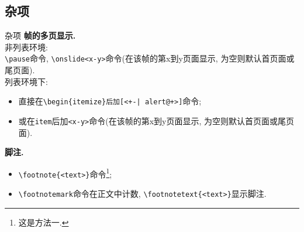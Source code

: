 \subsection{杂项}
\begin{frame}[fragile]{杂项}
	\textbf{帧的多页显示.}\\
	非列表环境: \\
	\verb|\pause|命令, \verb|\onslide<x-y>|命令(在该帧的第x到y页面显示, 为空则默认首页面或尾页面). \\
	列表环境下:
	\begin{itemize}[<+-| alert@+>]
		\item 直接在\verb|\begin|\verb!{itemize}后加!\verb![<+-| alert@+>]!命令;
		\item 或在\verb|item|后加\verb|<x-y>|命令(在该帧的第x到y页面显示, 为空则默认首页面或尾页面).
	\end{itemize}
	\textbf{脚注.}
	\begin{itemize}[<+-| alert@+>]
		\item \verb|\footnote|\verb|{<text>}|命令\footnote{这是方法一.};\\
		\item \verb|\footnotemark|命令在正文中计数, \verb|\footnotetext|\verb|{<text>}|显示脚注\footnotemark.
	\end{itemize}
\end{frame}

